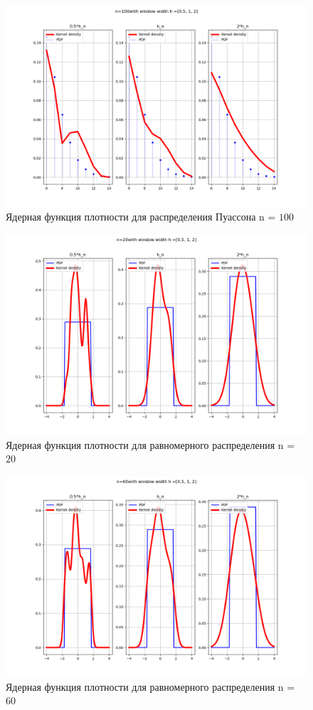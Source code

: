 \documentclass[a4]{article}
\begin{document}
\begin{center}
\begin{figure}[H]
	\caption{Ядерная функция плотности для распределения Пуассона n = $100$}
	\includegraphics[width=\textwidth]{poisson_pdf_100.png} 
\end{figure}

\begin{figure}[H]
\caption{ Ядерная функция плотности для равномерного распределения n = $20$}
\includegraphics[width=\textwidth]{uniform_pdf_20.png} 
\end{figure}

\begin{figure}[H]
	\caption{ Ядерная функция плотности для равномерного распределения n = $60$}
	\includegraphics[width=\textwidth]{uniform_pdf_60.png} 
\end{figure}


\end{center}
\end{document}
